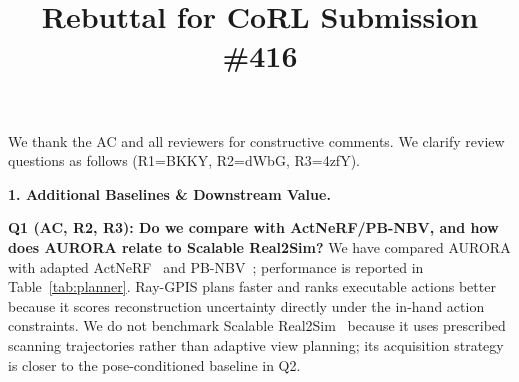 \documentclass[conference]{IEEEtran}
\newcommand{\newparagraph}[1]{{\bf #1.}}
\begin{document}
\title{Rebuttal for CoRL Submission \#416\vspace{-1cm}}
\maketitle
\thispagestyle{empty}

We thank the AC and all reviewers for constructive comments.
We clarify review questions as follows (R1=BKKY, R2=dWbG, R3=4zfY).

\newparagraph{1. Additional Baselines \& Downstream Value}

\textbf{Q1 (AC, R2, R3): Do we compare with ActNeRF/PB-NBV, and how does AURORA relate to Scalable Real2Sim?}
We have compared AURORA with adapted ActNeRF~\cite{actnerf} and
PB-NBV~\cite{pbnbv}; performance is reported in Table~\ref{tab:planner}.
Ray-GPIS plans faster and ranks executable actions better because it scores
reconstruction uncertainty directly under the in-hand action constraints. We
do not benchmark Scalable Real2Sim~\cite{pfaff2025_scalable_real2sim} because
it uses prescribed scanning trajectories rather than adaptive view planning;
its acquisition strategy is closer to the pose-conditioned baseline in Q2.
\end{document}
